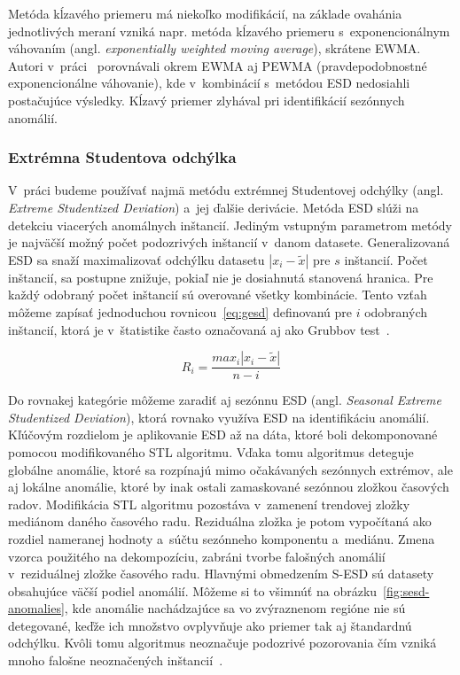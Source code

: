 \documentclass[a4paper,twoside,slovak,12pt,appendix]{article}
\begin{document}
Metóda kĺzavého priemeru má niekoľko modifikácií, na základe ovahánia
jednotlivých meraní vzniká napr. metóda kĺzavého priemeru s~exponencionálnym
váhovaním (angl. \textit{exponentially weighted moving average}), skrátene
EWMA. Autori v~práci~\cite{Hochenbaum2017} porovnávali okrem EWMA aj PEWMA
(pravdepodobnostné exponencionálne váhovanie), kde v~kombinácií s~metódou ESD
nedosiahli postačujúce výsledky. Kĺzavý priemer zlyhával pri identifikácií
sezónnych anomálií.


\subsubsection{Extrémna Studentova odchýlka}
\label{c:esd}
V~práci budeme používať najmä metódu extrémnej Studentovej odchýlky (angl.
\textit{Extreme Studentized Deviation}) a~jej ďalšie derivácie. Metóda
ESD slúži na detekciu viacerých anomálnych inštancií. Jediným vstupným
parametrom metódy je najväčší možný počet podozrivých inštancií v~danom
datasete. Generalizovaná ESD sa snaží maximalizovať odchýlku datasetu
$|x_i - \tilde{x}|$ pre $s$ inštancií. Počet inštancií, sa postupne znižuje,
pokiaľ nie je dosiahnutá stanovená hranica. Pre každý odobraný počet inštancií
sú overované všetky kombinácie. Tento vzťah môžeme zapísať jednoduchou
rovnicou~\ref{eq:gesd} definovanú pre $i$ odobraných inštancií, ktorá je
v~štatistike často označovaná aj ako Grubbov test~\cite{Kuppusamy2013,Rosner1983}.

\begin{equation}
	\label{eq:gesd}
  R_i = \frac
  {max_i |x_i - \tilde{x}|}
  {n - i}
\end{equation}

\noindent
Do rovnakej kategórie môžeme zaradiť aj sezónnu ESD (angl. \textit{Seasonal
Extreme Studentized Deviation}), ktorá rovnako využíva ESD na identifikáciu
anomálií. Kľúčovým rozdielom je aplikovanie ESD až na dáta, ktoré boli
dekomponované pomocou modifikovaného STL algoritmu. Vďaka tomu algoritmus
deteguje globálne anomálie, ktoré sa rozpínajú mimo očakávaných sezónnych
extrémov, ale aj lokálne anomálie, ktoré by inak ostali zamaskované sezónnou
zložkou časových radov. Modifikácia STL algoritmu pozostáva v~zamenení trendovej
zložky mediánom daného časového radu. Reziduálna zložka je potom vypočítaná ako
rozdiel nameranej hodnoty a~súčtu sezónneho komponentu a~mediánu. Zmena vzorca
použitého na dekompozíciu, zabráni tvorbe falošných anomálií v~reziduálnej
zložke časového radu. Hlavnými obmedzením S-ESD sú datasety obsahujúce
väčší podiel anomálií. Môžeme si to všimnúť na
obrázku~\ref{fig:sesd-anomalies}, kde anomálie nachádzajúce sa vo zvýraznenom
regióne nie sú detegované, keďže ich množstvo ovplyvňuje ako priemer tak aj
štandardnú odchýlku. Kvôli tomu algoritmus neoznačuje podozrivé pozorovania čím
vzniká mnoho falošne neoznačených inštancií~\cite{Hochenbaum2017}.
\end{document}

